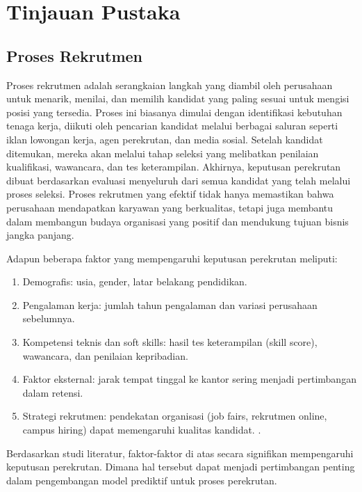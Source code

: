\newpage
\section{Tinjauan Pustaka}
\subsection{Proses Rekrutmen}
Proses rekrutmen adalah serangkaian langkah yang diambil oleh perusahaan untuk menarik, menilai, dan memilih kandidat yang paling sesuai untuk mengisi posisi yang tersedia. Proses ini biasanya dimulai dengan identifikasi kebutuhan tenaga kerja, diikuti oleh pencarian kandidat melalui berbagai saluran seperti iklan lowongan kerja, agen perekrutan, dan media sosial. Setelah kandidat ditemukan, mereka akan melalui tahap seleksi yang melibatkan penilaian kualifikasi, wawancara, dan tes keterampilan. Akhirnya, keputusan perekrutan dibuat berdasarkan evaluasi menyeluruh dari semua kandidat yang telah melalui proses seleksi. Proses rekrutmen yang efektif tidak hanya memastikan bahwa perusahaan mendapatkan karyawan yang berkualitas, tetapi juga membantu dalam membangun budaya organisasi yang positif dan mendukung tujuan bisnis jangka panjang. \parencite{mathis2017human}

Adapun beberapa faktor yang mempengaruhi keputusan perekrutan meliputi:
\begin{enumerate}
    \item Demografis: usia, gender, latar belakang pendidikan. \parencite{ng2005person}
    \item Pengalaman kerja: jumlah tahun pengalaman dan variasi perusahaan sebelumnya. \parencite{ployhart2006staffing}
    \item Kompetensi teknis dan soft skills: hasil tes keterampilan (skill score), wawancara, dan penilaian kepribadian. \parencite{schmidt1998validity}
    \item Faktor eksternal: jarak tempat tinggal ke kantor sering menjadi pertimbangan dalam retensi. \parencite{hausknecht2009targeted}
    \item Strategi rekrutmen: pendekatan organisasi (job fairs, rekrutmen online, campus hiring) dapat memengaruhi kualitas kandidat. \parencite{breaugh2013employee}.
\end{enumerate}

Berdasarkan studi literatur, faktor-faktor di atas secara signifikan mempengaruhi keputusan perekrutan. Dimana hal tersebut dapat menjadi pertimbangan penting dalam pengembangan model prediktif untuk proses perekrutan.

